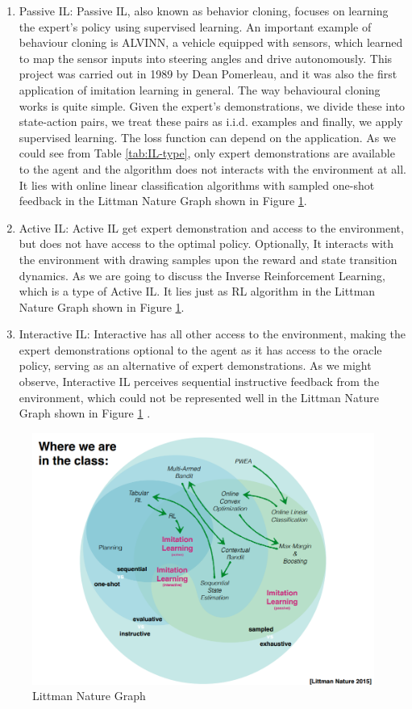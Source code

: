 \documentclass[11pt]{article}
\begin{document}
\begin{enumerate}
    \item Passive IL: Passive IL, also known as behavior cloning, focuses on learning the expert’s policy using supervised learning. An important example of behaviour cloning is ALVINN, a vehicle equipped with sensors, which learned to map the sensor inputs into steering angles and drive autonomously. This project was carried out in 1989 by Dean Pomerleau, and it was also the first application of imitation learning in general.
    The way behavioural cloning works is quite simple. Given the expert’s demonstrations, we divide these into state-action pairs, we treat these pairs as i.i.d. examples and finally, we apply supervised learning. The loss function can depend on the application. As we could see from Table \ref{tab:IL-type}, only expert demonstrations are available to the agent and the algorithm does not interacts with the environment at all. It lies with online linear classification algorithms with sampled one-shot feedback in the Littman Nature Graph shown in Figure \ref{fig:lion}.
    \item Active IL:
    Active IL get expert demonstration and access to the environment, but does not have access to the optimal policy. Optionally, It interacts with the environment with drawing samples upon the reward and state transition dynamics. As we are going to discuss the Inverse Reinforcement Learning, which is a type of Active IL. It lies just as RL algorithm in the 
    Littman Nature Graph shown in Figure \ref{fig:lion}.
    
    \item Interactive IL:
    Interactive has all other access to the environment, making the expert demonstrations optional to the agent as it has access to the oracle policy, serving as an alternative of expert demonstrations. As we might observe, Interactive IL perceives sequential instructive feedback from the environment, which could not be represented well in the Littman Nature Graph shown in Figure \ref{fig:lion} \cite{littman2015reinforcement}.
     
\end{enumerate}

\begin{figure}[H]
\centering
\includegraphics[width=0.8\linewidth]{1.png}
\caption{Littman Nature Graph}
\label{fig:lion}
\end{figure}
\end{document}
